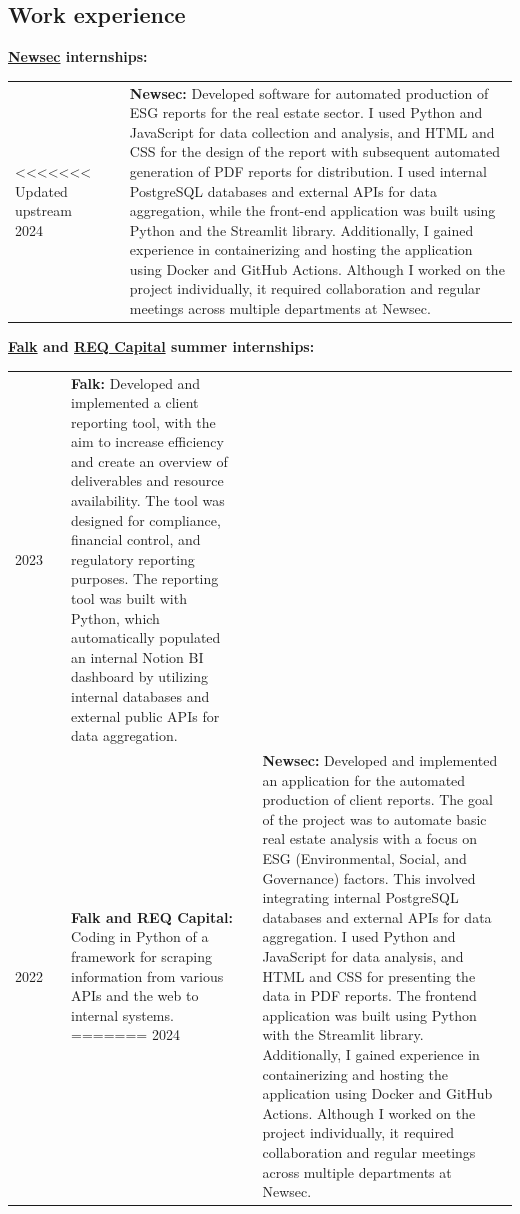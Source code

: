 \documentclass[10pt]{article}
\newlength{\cw}
\newlength{\cwl}
\begin{document}
\subsection*{Work experience}
 
\textbf{\href{https://www.newsec.no/}{Newsec} internships:}

\begin{tabular}{p{\cw} @{:}l p{\cwl}}
<<<<<<< Updated upstream
  2024 & & \textbf{Newsec:} Developed software for automated production of ESG reports for the real estate sector. I used Python and JavaScript for data collection and analysis, and HTML and CSS for the design of the report with subsequent automated generation of PDF reports for distribution. I used internal PostgreSQL databases and external APIs for data aggregation, while the front-end application was built using Python and the Streamlit library. Additionally, I gained experience in containerizing and hosting the application using Docker and GitHub Actions.  Although I worked on the project individually, it required collaboration and regular meetings across multiple departments at Newsec.
\end{tabular}

\textbf{\href{https://www.falkglobal.no/}{Falk} and \href{https://req.no/}{REQ Capital} summer internships:}

\begin{tabular}{p{\cw} @{:}l p{\cwl}}
  2023 & & \textbf{Falk:} Developed and implemented a client reporting tool, with the aim to increase efficiency and create an overview of deliverables and resource availability. The tool was designed for compliance, financial control, and regulatory reporting purposes. The reporting tool was built with Python, which automatically populated an internal Notion BI dashboard by utilizing internal databases and external public APIs for data aggregation.\\
  
  2022 & & \textbf{Falk and REQ Capital:} Coding in Python of a framework for scraping information from various APIs and the web to internal systems.
=======
  2024 & & \textbf{Newsec:} Developed and implemented an application for the automated production of client reports.
  The goal of the project was to automate basic real estate analysis with a focus on ESG (Environmental, Social, and Governance) factors.
  This involved integrating internal PostgreSQL databases and external APIs for data aggregation.
  I used Python and JavaScript for data analysis, and HTML and CSS for presenting the data in PDF reports.
  The frontend application was built using Python with the Streamlit library.
  Additionally, I gained experience in containerizing and hosting the application using Docker and GitHub Actions.
  Although I worked on the project individually, it required collaboration and regular meetings across multiple departments at Newsec.
  \\
\end{tabular}
\end{document}
